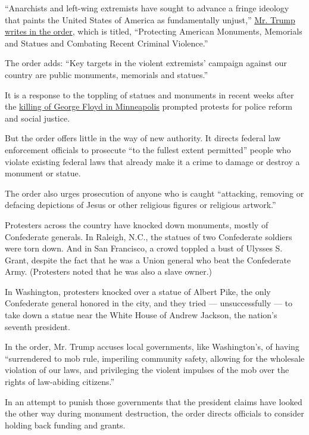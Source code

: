``Anarchists and left-wing extremists have sought to advance a fringe
ideology that paints the United States of America as fundamentally
unjust,''
\href{https://www.whitehouse.gov/presidential-actions/executive-order-protecting-american-monuments-memorials-statues-combating-recent-criminal-violence/}{Mr.
Trump writes in the order}, which is titled, ``Protecting American
Monuments, Memorials and Statues and Combating Recent Criminal
Violence.''

The order adds: ``Key targets in the violent extremists' campaign
against our country are public monuments, memorials and statues.''

It is a response to the toppling of statues and monuments in recent
weeks after the
\href{https://www.nytimes.com/2020/05/31/us/george-floyd-investigation.html}{killing
of George Floyd in Minneapolis} prompted protests for police reform and
social justice.

But the order offers little in the way of new authority. It directs
federal law enforcement officials to prosecute ``to the fullest extent
permitted'' people who violate existing federal laws that already make
it a crime to damage or destroy a monument or statue.

The order also urges prosecution of anyone who is caught ``attacking,
removing or defacing depictions of Jesus or other religious figures or
religious artwork.''

Protesters across the country have knocked down monuments, mostly of
Confederate generals. In Raleigh, N.C., the statues of two Confederate
soldiers were torn down. And in San Francisco, a crowd toppled a bust of
Ulysses S. Grant, despite the fact that he was a Union general who beat
the Confederate Army. (Protesters noted that he was also a slave owner.)

In Washington, protesters knocked over a statue of Albert Pike, the only
Confederate general honored in the city, and they tried ---
unsuccessfully --- to take down a statue near the White House of Andrew
Jackson, the nation's seventh president.

In the order, Mr. Trump accuses local governments, like Washington's, of
having ``surrendered to mob rule, imperiling community safety, allowing
for the wholesale violation of our laws, and privileging the violent
impulses of the mob over the rights of law-abiding citizens.''

In an attempt to punish those governments that the president claims have
looked the other way during monument destruction, the order directs
officials to consider holding back funding and grants.

